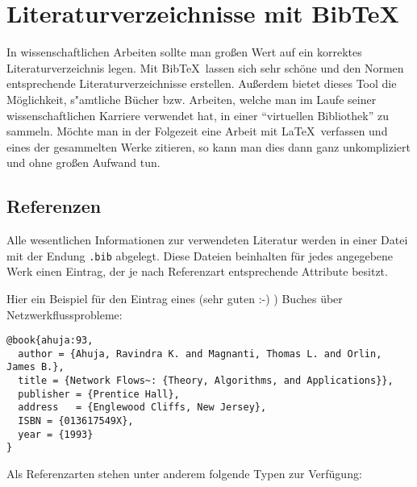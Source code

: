 
\section{Literaturverzeichnisse mit Bib\TeX}

In wissenschaftlichen Arbeiten sollte man großen Wert auf ein korrektes Literaturverzeichnis legen. Mit Bib\TeX \ lassen sich sehr schöne und den Normen entsprechende Literaturverzeichnisse erstellen. Außerdem bietet dieses Tool die Möglichkeit, s"amtliche Bücher bzw. Arbeiten, welche man im Laufe seiner wissenschaftlichen Karriere verwendet hat, in einer "`virtuellen Bibliothek"' zu sammeln. Möchte man in der Folgezeit eine Arbeit mit \LaTeX \ verfassen und eines der gesammelten Werke zitieren, so kann man dies dann ganz unkompliziert und ohne großen Aufwand tun.

\subsection*{Referenzen}

Alle wesentlichen Informationen zur verwendeten Literatur werden in einer Datei mit der Endung \texttt{.bib} abgelegt. Diese Dateien beinhalten für jedes angegebene Werk einen Eintrag, der je nach Referenzart entsprechende Attribute besitzt.

Hier ein Beispiel für den Eintrag eines (sehr guten :-) ) Buches über Netzwerkflussprobleme:

{\small\begin{verbatim}
@book{ahuja:93,
  author = {Ahuja, Ravindra K. and Magnanti, Thomas L. and Orlin, James B.},
  title = {Network Flows~: {Theory, Algorithms, and Applications}},
  publisher = {Prentice Hall},
  address	= {Englewood Cliffs, New Jersey},
  ISBN = {013617549X},
  year = {1993}
}
\end{verbatim}}

Als Referenzarten stehen unter anderem folgende Typen zur Verfügung:

